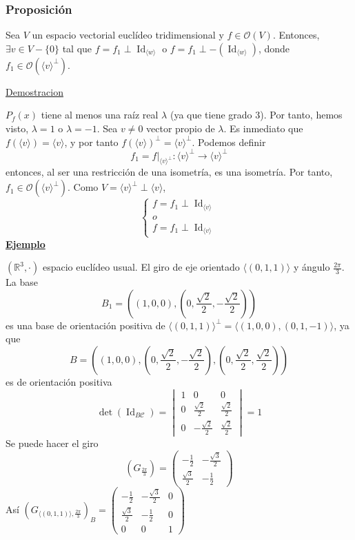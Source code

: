 \documentclass[12pt, a4paper, ones, notitlepage, openany,titlepage]{article}
\newcommand{\ejemplo}{\noindent\underline{\textbf{Ejemplo}}}
\begin{document}
\subsubsection{Proposición}
Sea $V$ un espacio vectorial euclídeo tridimensional y $f \in \mathcal{O}(V)$. Entonces, $\exists v \in V - \{0\}$ tal que $f = f_1 \perp \operatorname{Id}_{\langle w \rangle}$ o $f = f_1 \perp -(\operatorname{Id}_{\langle w \rangle})$, donde $f_1 \in \mathcal{O}(\langle v \rangle^\perp)$.

\noindent\underline{Demostracion}

$P_f(x)$ tiene al menos una raíz real $\lambda$ (ya que tiene grado $3$). Por tanto, hemos visto, $\lambda = 1$ o $\lambda = -1$. Sea $v \neq 0$ vector propio de $\lambda$. Es inmediato que $f(\langle v \rangle) = \langle v \rangle$, y por tanto $f(\langle v \rangle)^\perp = \langle v \rangle^\perp$. Podemos definir
$$
f_1 = f|_{\langle v \rangle^\perp} : \langle v \rangle^\perp \longrightarrow \langle v \rangle^\perp
$$
entonces, al ser una restricción de una isometría, es una isometría. Por tanto, $f_1 \in \mathcal{O}(\langle v \rangle^\perp)$. Como $V = \langle v \rangle^\perp \perp \langle v \rangle$,
$$\begin{cases}
	f = f_1 \perp \operatorname{Id}_{\langle v \rangle} \\
	o \\
	f = f_1 \perp \operatorname{Id}_{\langle v \rangle}
\end{cases}
$$
\ejemplo

$(\mathbb{R}^3, \cdot)$ espacio euclídeo usual. El giro de eje orientado $\langle (0, 1, 1) \rangle$ y ángulo $\displaystyle \frac{2\pi}{3}$. La base 
$$
\displaystyle B_1 = \left(\left(1,0,0\right),\left(0, \frac{\sqrt{2}}{2},-\frac{\sqrt{2}}{2}\right)\right)
$$
es una base de orientación positiva de $\langle(0,1,1)\rangle^\perp = \langle (1,0,0),(0,1,-1)\rangle$, ya que 
$$
B = \left(\left(1,0,0\right),\left(0, \frac{\sqrt{2}}{2},-\frac{\sqrt{2}}{2}\right),\left(0, \frac{\sqrt{2}}{2},\frac{\sqrt{2}}{2}\right)\right)
$$
es de orientación positiva
$$
\operatorname{det}\left(\operatorname{Id}_{B\mathcal{C}}\right) = \begin{vmatrix}
	1 & 0 & 0 \\
	0 & \frac{\sqrt{2}}{2} & \frac{\sqrt{2}}{2} \\
	0 & -\frac{\sqrt{2}}{2} & \frac{\sqrt{2}}{2}
\end{vmatrix} = 1
$$
Se puede hacer el giro
$$
\left(G_{\frac{2\pi}{3}}\right) = \begin{pmatrix}
	-\frac{1}{2} & -\frac{\sqrt{3}}{2} \\
	\frac{\sqrt{3}}{2} & -\frac{1}{2}
\end{pmatrix}
$$
Así
$\left(G_{\langle (0,1,1) \rangle, \frac{2\pi}{3}}\right)_B = \begin{pmatrix}
	-\frac{1}{2} & -\frac{\sqrt{3}}{2} & 0 \\
	\frac{\sqrt{3}}{2} & -\frac{1}{2} & 0 \\
	0 & 0 & 1
\end{pmatrix}$
\end{document}
